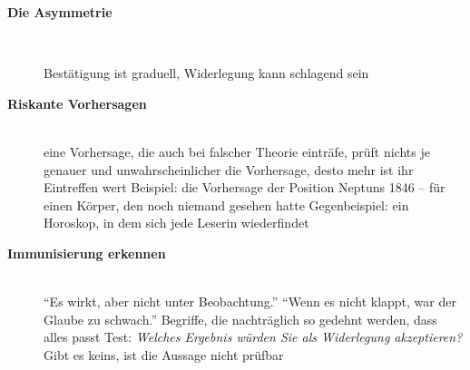 \begin{description}

\item[{\rot\bf Die Asymmetrie}]~\\[-\lblskip]
\begin{center}
\end{center}
\bi
  \ite Bestätigung ist graduell, Widerlegung kann schlagend sein
\ei
\os{\newpage}

\item[{\rot\bf Riskante Vorhersagen}]~\\[-\lblskip]
\bi
  \ite eine Vorhersage, die auch bei falscher Theorie einträfe, prüft
    nichts
  \ite je genauer und unwahrscheinlicher die Vorhersage, desto mehr ist
    ihr Eintreffen wert
  \ite Beispiel: die Vorhersage der Position Neptuns 1846 -- für einen
    Körper, den noch niemand gesehen hatte
  \ite Gegenbeispiel: ein Horoskop, in dem sich jede Leserin wiederfindet
\ei
\os{\newpage}

\item[{\rot\bf Immunisierung erkennen}]~\\[-\lblskip]
\bi
  \ite \enquote{Es wirkt, aber nicht unter Beobachtung.}
  \ite \enquote{Wenn es nicht klappt, war der Glaube zu schwach.}
  \ite Begriffe, die nachträglich so gedehnt werden, dass alles passt
  \ite Test: \emph{Welches Ergebnis würden Sie als Widerlegung
    akzeptieren?} Gibt es keins, ist die Aussage nicht prüfbar
\ei
\os{\newpage}
\end{description}

